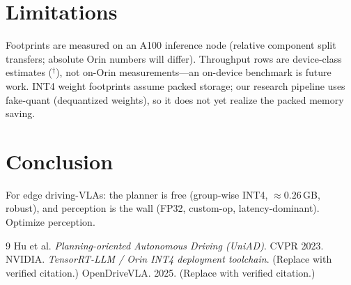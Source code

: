 \documentclass[conference]{IEEEtran}
\begin{document}
\section{Limitations}
Footprints are measured on an A100 inference node (relative component split transfers; absolute Orin
numbers will differ). Throughput rows are device-class estimates ($^\dagger$), not on-Orin
measurements---an on-device benchmark is future work. INT4 weight footprints assume packed storage;
our research pipeline uses fake-quant (dequantized weights), so it does not yet realize the packed
memory saving.

\section{Conclusion}
For edge driving-VLAs: the planner is free (group-wise INT4, $\approx 0.26$\,GB, robust), and
perception is the wall (FP32, custom-op, latency-dominant). Optimize perception.

\begin{thebibliography}{9}
 Hu et al. \emph{Planning-oriented Autonomous Driving (UniAD)}. CVPR 2023.
 NVIDIA. \emph{TensorRT-LLM / Orin INT4 deployment toolchain}. (Replace with verified citation.)
 OpenDriveVLA. 2025. (Replace with verified citation.)
\end{thebibliography}
\end{document}
